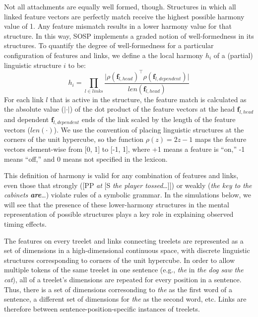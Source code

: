 \documentclass[10pt,letterpaper]{article}
\begin{document}
Not all attachments are equally well formed, though. Structures in which all linked feature vectors are perfectly match receive the highest possible harmony value of 1. Any feature mismatch results in a lower harmony value for that structure. In this way, SOSP implements a graded notion of well-formedness in its structures. To quantify the degree of well-formedness for a particular configuration of features and links, we define a the local harmony $h_i$ of a (partial) linguistic structure $i$ to be:
\begin{equation}\label{local_harmony}
h_i = \prod_{l\in links} \frac{\vert\rho(\mathbf{f}_{l, head})^\intercal \rho(\mathbf{f}_{l, dependent})\vert}{len(\mathbf{f}_{l, head})}
\end{equation}
For each link $l$ that is active in the structure, the feature match is calculated as the absolute value ($\vert\cdot\vert$) of the dot product of the feature vectors at the head $\mathbf{f}_{l, head}$ and dependent $\mathbf{f}_{l, dependent}$ ends of the link scaled by the length of the feature vectors ($len(\cdot)$). We use the convention of placing linguistic structures at the corners of the unit hypercube, so the function $\rho(z) = 2z - 1$ maps the feature vectors element-wise from [0, 1] to [-1, 1], where +1 means a feature is ``on,'' -1 means ``off,'' and 0 means not specified in the lexicon.

This definition of harmony is valid for any combination of features and links, even those that strongly ([PP \emph{at} [S \emph{the player tossed}\dots]]) or weakly (\emph{the key to the cabinets \textbf{are}}\dots) violate rules of a symbolic grammar. In the simulations below, we will see that the presence of these lower-harmony structures in the mental representation of possible structures plays a key role in explaining observed timing effects.

The features on every treelet and links connecting treelets are represented as a set of dimensions in a high-dimensional continuous space, with discrete linguistic structures corresponding to corners of the unit hypercube. In order to allow multiple tokens of the same treelet in one sentence (e.g., \emph{the} in \emph{the dog saw the cat}), all of a treelet's dimensions are repeated for every position in a sentence. Thus, there is a set of dimensions corresonding to \emph{the} as the first word of a sentence, a different set of dimensions for \emph{the} as the second word, etc. Links are therefore between sentence-position-specific instances of treelets.
\end{document}
